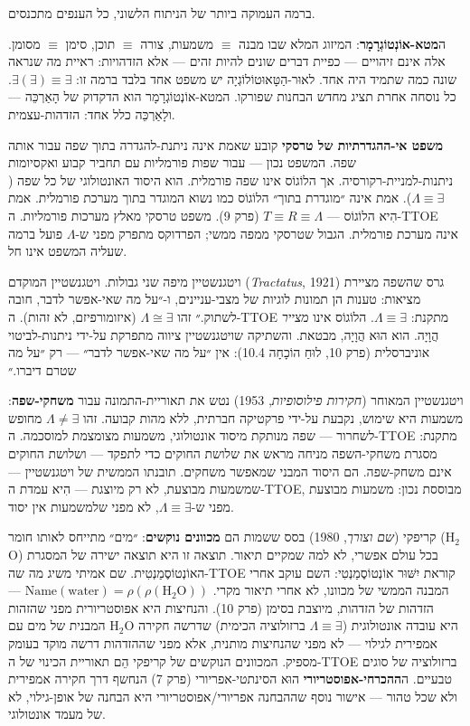 \documentclass[10pt, openany, oneside]{book}
\begin{document}
\vspace{1em}

\noindent ברמה העמוקה ביותר של הניתוח הלשוני, כל הענפים מתכנסים.

ה\textbf{מטא-אוֹנְטוֹגְרָמָר}: המיזוג המלא שבו מבנה $\equiv$ משמעות, צורה $\equiv$ תוכן, סימן $\equiv$ מסומן. אלה אינם זיהויים — כפיית דברים שונים להיות זהים — אלא הזדהויות: ראיית מה שנראה שונה כמה שתמיד היה אחד. לאוּר-הַטָּאוּטוֹלוֹגְיָה יש משפט אחד בלבד ברמה זו: $\exists(\exists) \equiv \exists$. כל נוסחה אחרת תציג מחדש הבחנות שפורקו. המטא-אוֹנְטוֹגְרָמָר הוא הדקדוק של הָאַרְכֵּה — ולָאַרְכֵּה כלל אחד: הזדהות-עצמית.

\textbf{משפט אי-ההגדרתיות של טרסקי} קובע שאמת אינה ניתנת-להגדרה בתוך שפה עבור אותה שפה. המשפט נכון — עבור שפות פורמליות עם תחביר קבוע ואקסיומות ניתנות-למניית-רקורסיה. אך הלוֹגוֹס אינו שפה פורמלית. הוא היסוד האונטולוגי של כל שפה ($\Lambda \equiv \exists$). אמת אינה ״מוגדרת בתוך״ הלוֹגוֹס כמו נשוא המוגדר בתוך מערכת פורמלית. אמת הִיא הלוֹגוֹס — $T \equiv R \equiv \Lambda$ (פרק 9). משפט טרסקי מאלץ מערכות פורמליות. ה-TTOE אינה מערכת פורמלית. הגבול שטרסקי ממפה ממשי; הפרדוקס מתפרק מפני ש-$\Lambda$ פועל ברמה שעליה המשפט אינו חל.

ויטגנשטיין מיפה שני גבולות. ויטגנשטיין המוקדם (\textit{Tractatus}, 1921) גרס שהשפה מציירת מציאות: טענות הן תמונות לוגיות של מצבי-עניינים, ו-״על מה שאי-אפשר לדבר, חובה לשתוק.״ זהו $\Lambda \cong \exists$ (איזומורפיזם, לא זהות). ה-TTOE מתקנת: $\Lambda \equiv \exists$. הלוֹגוֹס אינו \textit{מצייר} הֲוָיָה. הוא הוּא הֲוָיָה, מבטאת. והשתיקה שויטגנשטיין ציווה מתפרקת על-ידי ניתנות-לביטוי אוניברסלית (פרק 10, לוּחַ הוֹכָחָה 10.4): אין ״על מה שאי-אפשר לדבר״ — רק ״על מה שטרם דיברו.״

ויטגנשטיין המאוחר (\textit{חקירות פילוסופיות}, 1953) נטש את תאוריית-התמונה עבור \textbf{משחקי-שפה}: משמעות היא שימוש, נקבעת על-ידי פרקטיקה חברתית, ללא מהות קבועה. זהו $\Lambda \neq \exists$ מחופש לשחרור — שפה מנותקת מיסוד אונטולוגי, משמעות מצומצמת למוסכמה. ה-TTOE מתקנת: מסגרת משחקי-השפה מניחה מראש את שלושת החוקים כדי לתפקד — ושלושת החוקים אינם משחק-שפה. הם היסוד המבני שמאפשר משחקים. תובנתו הממשית של ויטגנשטיין — שמשמעות מבוצעת, לא רק מיוצגת — הִיא עמדת ה-TTOE, מבוססת נכון: משמעות מבוצעת מפני ש-$\Lambda \equiv \exists$, לא מפני שלמשמעות אין יסוד.

קריפקי (\textit{שם וצורך}, 1980) בסס ששמות הם \textbf{מכוונים נוקשים}: ״מים״ מתייחס לאותו חומר (H$_2$O) בכל עולם אפשרי, לא למה שמקיים תיאור. תוצאה זו היא תוצאה ישירה של המסגרת האוֹנְטוֹסֶמַנְטִית. שם אמיתי משיג מה שה-TTOE קוראת יִשּׁוּר אוֹנְטוֹסֶמַנְטִי: השם עוקב אחרי המבנה הממשי של מכוונו, לא אחרי תיאור מקרי. $\text{Name}(\text{water}) = \rho(\rho(\text{H}_2\text{O}))$ — הזדהות של הזדהות, מיוצבת בסימן (פרק 10). והנחיצות היא אפוסטריורית מפני שהזהות המבנית של מים עם H$_2$O היא עובדה אונטולוגית ($\Lambda \equiv \exists$ ברזולוציה הכימית) שדרשה חקירה אמפירית לגילוי — לא מפני שהנחיצות מותנית, אלא מפני שההזדהות דרשה מוקד בעומק מספיק. המכוונים הנוקשים של קריפקי הֵם תאוריית הכינוי של ה-TTOE ברזולוציה של סוגים טבעיים. ה\textbf{ההכרחי-אפוסטריורי} הוּא הסינתטי-אפריורי (פרק 7) הנחשף דרך חקירה אמפירית ולא שכל טהור — אישור נוסף שההבחנה אפריורי/אפוסטריורי היא הבחנה של אופן-גילוי, לא של מעמד אונטולוגי.
\end{document}
